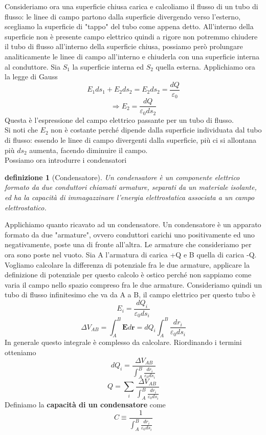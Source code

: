 \documentclass[10pt,a4paper]{article}
\newtheorem{definizione}{definizione}
\begin{document}
Consideriamo ora una superficie chiusa carica e calcoliamo il flusso di un tubo di flusso: le linee di campo partono dalla superficie divergendo verso l'esterno, scegliamo la superficie di "tappo" del tubo come appena detto. All'interno della superficie non è presente campo elettrico quindi a rigore non potremmo chiudere il tubo di flusso all'interno della superficie chiusa, possiamo però prolungare analiticamente le linee di campo all'interno e chiuderla con una superficie interna al conduttore. Sia \(S_1\) la superficie interna ed \(S_2\) quella esterna. Applichiamo ora la legge di Gauss
\[E_1ds_1+E_2ds_2 = E_2ds_2 = \frac{dQ}{\varepsilon_0}\]
\[\Rightarrow E_2 = \frac{dQ}{\varepsilon_0 ds_2}\]
Questa è l'espressione del campo elettrico passante per un tubo di flusso.\\
Si noti che \(E_2\) non è costante perché dipende dalla superficie individuata dal tubo di flusso: essendo le linee di campo divergenti dalla superficie, più ci si allontana più \(ds_2\) aumenta, facendo diminuire il campo.\\
Possiamo ora introdurre i condensatori
\begin{definizione}[Condensatore]
	Un condensatore è un componente elettrico formato da due conduttori chiamati armature, separati da un materiale isolante, ed ha la capacità di immagazzinare l'energia elettrostatica associata a un campo elettrostatico.
\end{definizione}
Applichiamo quanto ricavato ad un condensatore. Un condensatore è un apparato formato da due "armature", ovvero conduttori carichi uno positivamente ed uno negativamente, poste una di fronte all'altra. Le armature che consideriamo per ora sono poste nel vuoto. Sia A l'armatura di carica +Q e B quella di carica -Q. Vogliamo calcolare la differenza di potenziale fra le due armature, applicare la definizione di potenziale per questo calcolo è ostico perché non sappiamo come varia il campo nello spazio compreso fra le due armature. Consideriamo quindi un tubo di flusso infinitesimo che va da A a B, il campo elettrico per questo tubo è
\[E_i  = \frac{dQ_i}{\varepsilon_0 ds_i}\]
\[\Delta V_{AB} = \int_{A}^{B}\mathbf{E}d\mathbf{r} =dQ_i \int_{A}^{B}\frac{dr_i}{\varepsilon_0 ds_i}\]
In generale questo integrale è complesso da calcolare. Riordinando i termini otteniamo
\[dQ_i = \frac{\Delta V_{AB}}{\int_{A}^{B}\frac{dr_i}{\varepsilon_0 ds_i}}\]
\[Q = \sum_i\frac{\Delta V_{AB}}{\int_{A}^{B}\frac{dr_i}{\varepsilon_0 ds_i}}\]
Definiamo la \textbf{capacità di un condensatore} come
\[C\equiv \frac{1}{{ \int_{A}^{B}\frac{dr_i}{\varepsilon_0 ds_i}}}\]
\end{document}
